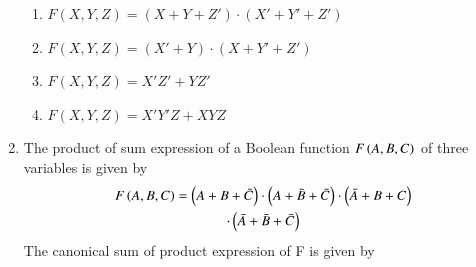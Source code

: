 \begin{enumerate}[label=\arabic*.,ref=\theenumi]
\begin{enumerate}
    \item $F(X, Y, Z) = (X + Y + Z') \cdot (X' + Y' + Z')$
    \item $F(X, Y, Z) = (X'+ Y) \cdot (X + Y' + Z')$
    \item $F(X, Y, Z) = X'Z' + YZ'$
    \item $F(X, Y, Z) = X'Y'Z + XYZ$
\end{enumerate}

\item The product of sum expression of a Boolean function $F\left(A,B,C\right)$ of three variables is given by
\begin{multline}
F\left(A,B,C\right) = \left(A + B + \bar{C}\right)\cdot\left(A + \bar{B} +\bar{C}\right)\cdot\left(\bar{A} + B + C\right)
	\\
	\cdot\left(\bar{A} + \bar{B} + \bar{C}\right)
\end{multline}
The canonical sum of product expression of F is  given by

\end{enumerate}
